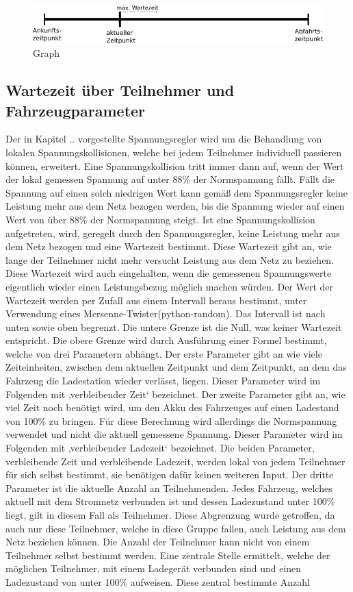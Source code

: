 \begin{figure}[htb]
	\includegraphics[width = \linewidth]{img/SA_participants_Graph2.png}
	\caption{Graph}
	\label{SAPart:Graph}
\end{figure}

\subsection{Wartezeit über Teilnehmer und Fahrzeugparameter}
Der in Kapitel .. vorgestellte Spannungsregler wird um die Behandlung von lokalen Spannungskollisionen, welche bei jedem Teilnehmer individuell passieren können, erweitert. Eine Spannungskollision tritt immer dann auf, wenn der Wert der lokal gemessen Spannung auf unter 88\% der Normspannung fällt. Fällt die Spannung auf einen solch niedrigen Wert kann gemäß dem Spannungsregler keine Leistung mehr aus dem Netz bezogen werden, bis die Spannung wieder auf einen Wert von über 88\% der Normspannung steigt. Ist eine Spannungskollision aufgetreten, wird, geregelt durch den Spannungsregler, keine Leistung mehr aus dem Netz bezogen und eine Wartezeit bestimmt. Diese Wartezeit gibt an, wie lange der Teilnehmer nicht mehr versucht Leistung aus dem Netz zu beziehen. Diese Wartezeit wird auch eingehalten, wenn die gemessenen Spannungswerte eigentlich wieder einen Leistungsbezug möglich machen würden. Der Wert der Wartezeit werden per Zufall aus einem Intervall heraus bestimmt, unter Verwendung eines Mersenne-Twister(python-random). Das Intervall ist nach unten sowie oben begrenzt. Die untere Grenze ist die Null, was keiner Wartezeit entspricht. Die obere Grenze wird durch Ausführung einer Formel bestimmt, welche von drei Parametern abhängt.  Der erste Parameter gibt an wie viele Zeiteinheiten, zwischen dem aktuellen Zeitpunkt und dem Zeitpunkt, an dem das Fahrzeug die Ladestation wieder verlässt, liegen. Dieser Parameter wird im Folgenden mit ‚verbleibender Zeit‘ bezeichnet. Der zweite Parameter gibt an, wie viel Zeit noch benötigt wird, um den Akku des Fahrzeuges auf einen Ladestand von 100\% zu bringen. Für diese Berechnung wird allerdings die Normspannung verwendet und nicht die aktuell gemessene Spannung. Dieser Parameter wird im Folgenden mit ‚verbleibender Ladezeit‘ bezeichnet. Die beiden Parameter, verbleibende Zeit und verbleibende Ladezeit, werden lokal von jedem Teilnehmer für sich selbst bestimmt, sie benötigen dafür keinen weiteren Input. Der dritte Parameter ist die aktuelle Anzahl an Teilnehmenden. Jedes Fahrzeug, welches aktuell mit dem Stromnetz verbunden ist und dessen Ladezustand unter 100\% liegt, gilt in diesem Fall als Teilnehmer. Diese Abgrenzung wurde getroffen, da auch nur diese Teilnehmer, welche in diese Gruppe fallen, auch Leistung aus dem Netz beziehen können. Die Anzahl der Teilnehmer kann nicht von einem Teilnehmer selbst bestimmt werden. Eine zentrale Stelle ermittelt, welche der möglichen Teilnehmer, mit einem Ladegerät verbunden sind und einen Ladezustand von unter 100\% aufweisen. Diese zentral bestimmte Anzahl 